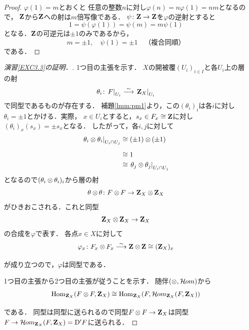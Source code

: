 \begin{proof}
    \(\varphi(1)=m\)とおくと
    任意の整数\(n\)に対し\(\varphi(n)=n\varphi(1)=nm\)となるので，
    \(\zz\)から\(\zz\)への射は\(m\)倍写像である．
    \(\psi\colon\zz\to\zz\)を\(\varphi\)の逆射とすると
    \[
        1=\psi(\varphi(1))=\psi(m)=m\psi(1)
    \]
    となる．\(\zz\)の可逆元は\(\pm1\)のみであるから，
    \[
        m=\pm1,
        \quad
        \psi(1)=\pm1
        \quad
        \text{（複合同順）}
    \]
    である．
\end{proof}

\begin{proof}[{演習\ref{EXC3.3}の証明．}]
    1つ目の主張を示す．
    \(X\)の開被覆\((U_i)_{i\in I}\)と各\(U_i\)上の層の射
    \[
        \theta_i\colon\mres[F]{U_{i}}\simar\mres[\zz_X]{U_{i}}
    \]で同型であるものが存在する．
    補題\ref{lmm:pm1}より，この\((\theta_i)_{i}\)は各\(i\)に対し
    \(\theta_i=\pm1\)とかける．実際，
    \(x\in U_i\)とすると，\(s_x\in F_x\cong\zz\)に対し\(
        (\theta_{i})_x(s_x)=\pm{s_x}
    \)となる．
    したがって，各\(i,j\)に対して    
    \begin{align*}
        \mres[\theta_{i}\otimes\theta_{i}]{{U_{i}\cap U_{j}}}
        &\cong
        (\pm1)\ttens[](\pm1)\\
        &\cong
        1\\
        &\cong
        \mres[\theta_{j}\otimes\theta_{j}]{{U_{i}\cap U_{j}}}
    \end{align*}
    となるので\((\theta_i\ttens[]\theta_i)_i\)から層の射
    \[
        \theta\tens[]\theta\colon F\tens[]F
        \to\zz_X\tens[]\zz_X
    \]
    がひきおこされる．これと同型
    \[
        \zz_X\tens[]\zz_X\to\zz_X
    \]
    の合成を\(\varphi\)で表す．
    各点\(x\in X\)に対して
    \[
        \varphi_x\colon F_x\ttens[]F_x\simar\zz\ttens[]\zz\cong(\zz_{X})_x
    \]が成り立つので，\(\varphi\)は同型である．

    1つ目の主張から2つ目の主張が従うことを示す．
    随伴\((\ttens[],\HOM)\)から
    \begin{align*}
        \Hom_{\zz_X}(F\ttens[]F,\zz_X)
        \cong
        \Hom_{\zz_X}(F,\HOM_{\zz_X}(F,\zz_X))
    \end{align*}
    である．
    同型は同型に送られるので同型\(
        F\ttens[]F\to \zz_X
    \)は同型\(F\to\HOM_{\zz_X}(F,\zz_X)=\rmD'F\)に送られる．
\end{proof}




